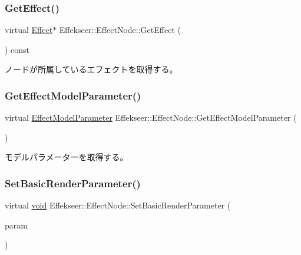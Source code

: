 \subsubsection{\texorpdfstring{Get\+Effect()}{GetEffect()}}
{\footnotesize\ttfamily virtual \mbox{\hyperlink{class_effekseer_1_1_effect}{Effect}}$\ast$ Effekseer\+::\+Effect\+Node\+::\+Get\+Effect (\begin{DoxyParamCaption}{ }\end{DoxyParamCaption}) const\hspace{0.3cm}{\ttfamily [pure virtual]}}



ノードが所属しているエフェクトを取得する。 

\mbox{\label{class_effekseer_1_1_effect_node_a6fc47c5de5057a81240d4df22887b2c2}} 
\subsubsection{\texorpdfstring{Get\+Effect\+Model\+Parameter()}{GetEffectModelParameter()}}
{\footnotesize\ttfamily virtual \mbox{\hyperlink{struct_effekseer_1_1_effect_model_parameter}{Effect\+Model\+Parameter}} Effekseer\+::\+Effect\+Node\+::\+Get\+Effect\+Model\+Parameter (\begin{DoxyParamCaption}{ }\end{DoxyParamCaption})\hspace{0.3cm}{\ttfamily [pure virtual]}}



モデルパラメーターを取得する。 

\mbox{\label{class_effekseer_1_1_effect_node_a064ec945f4ced3b7935520d625e4c92e}} 
\subsubsection{\texorpdfstring{Set\+Basic\+Render\+Parameter()}{SetBasicRenderParameter()}}
{\footnotesize\ttfamily virtual \mbox{\hyperlink{namespace_effekseer_ab34c4088e512200cf4c2716f168deb56}{void}} Effekseer\+::\+Effect\+Node\+::\+Set\+Basic\+Render\+Parameter (\begin{DoxyParamCaption}\item[{\mbox{\hyperlink{struct_effekseer_1_1_effect_basic_render_parameter}{Effect\+Basic\+Render\+Parameter}}}]{param }\end{DoxyParamCaption})\hspace{0.3cm}{\ttfamily [pure virtual]}}



